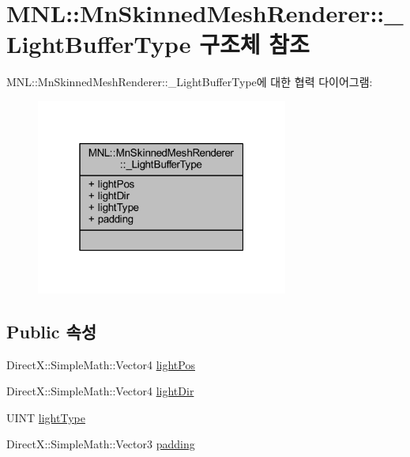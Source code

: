 \hypertarget{struct_m_n_l_1_1_mn_skinned_mesh_renderer_1_1___light_buffer_type}{}\section{M\+NL\+:\+:Mn\+Skinned\+Mesh\+Renderer\+:\+:\+\_\+\+Light\+Buffer\+Type 구조체 참조}
\label{struct_m_n_l_1_1_mn_skinned_mesh_renderer_1_1___light_buffer_type}


M\+NL\+:\+:Mn\+Skinned\+Mesh\+Renderer\+:\+:\+\_\+\+Light\+Buffer\+Type에 대한 협력 다이어그램\+:\nopagebreak
\begin{figure}[H]
\begin{center}
\leavevmode
\includegraphics[width=235pt]{struct_m_n_l_1_1_mn_skinned_mesh_renderer_1_1___light_buffer_type__coll__graph}
\end{center}
\end{figure}
\subsection*{Public 속성}
\begin{DoxyCompactItemize}
\item 
Direct\+X\+::\+Simple\+Math\+::\+Vector4 \hyperlink{struct_m_n_l_1_1_mn_skinned_mesh_renderer_1_1___light_buffer_type_a3b2648fb7a53ce9be3c70dde56a2a7e6}{light\+Pos}
\item 
Direct\+X\+::\+Simple\+Math\+::\+Vector4 \hyperlink{struct_m_n_l_1_1_mn_skinned_mesh_renderer_1_1___light_buffer_type_ab0db31c912e02314a132688390771913}{light\+Dir}
\item 
U\+I\+NT \hyperlink{struct_m_n_l_1_1_mn_skinned_mesh_renderer_1_1___light_buffer_type_a6719a54f505e7a34b0f74a01973db0d0}{light\+Type}
\item 
Direct\+X\+::\+Simple\+Math\+::\+Vector3 \hyperlink{struct_m_n_l_1_1_mn_skinned_mesh_renderer_1_1___light_buffer_type_a6f2c2a324da4a7f48f3538f504a42e47}{padding}
\end{DoxyCompactItemize}



